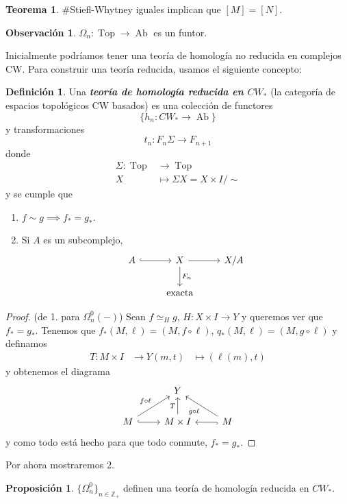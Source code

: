 \documentclass[spanish]{book}
\theoremstyle{definition}
\newtheorem*{defn}{Definición}
\newtheorem*{obs}{Observación}
\newtheorem*{teo}{Teorema}
\newtheorem*{prop}{Proposición}
\newcommand{\Z}{\mathbb{Z}}
\begin{document}
	\begin{teo}
		\#Stiefl-Whytney iguales implican que $[M]=[N]$.
	\end{teo}
	\begin{obs}
		$\Omega_n:\operatorname{Top}\to\operatorname{Ab}$ es un funtor.
	\end{obs}
	Inicialmente podríamos tener una teoría de homología no reducida en complejos CW. Para construir una teoría reducida, usamos el siguiente concepto:
	\begin{defn}
		Una \textbf{\textit{teoría de homología reducida en $CW_*$}} (la categoría de espacios topológicos CW basados) es una colección de functores
		\[\{h_n:CW_*\to\operatorname{Ab}\}\]
		y transformaciones
		\[t_n:F_n\Sigma\to F_{n+1}\]
		donde
		\begin{align*}
			\Sigma:\operatorname{Top}&\to\operatorname{Top}\\
			X&\mapsto \Sigma X=X\times I/\sim
		\end{align*}
		y se cumple que
		\begin{enumerate}
			\item $f\sim g\implies f_*=g_*$.
			\item Si $A$ es un subcomplejo,
			\[ \begin{tikzcd}
				A\arrow[r,hook]&X\arrow[d,"F_n"]\arrow[r]&X/A\\
				&\text{exacta}
			\end{tikzcd}\]
		\end{enumerate}
	\end{defn}
	\begin{proof}
		(de 1. para $\Omega_n^0(-)$) Sean $f\simeq_Hg$, $H:X\times I\to Y$ y queremos ver que $f_*=g_*$. Tenemos que $f_*(M,\ell)=(M,f\circ\ell)$, $q_*(M,\ell)=(M,g\circ\ell)$ y definamos
		\begin{align*}
			T:M\times I&\to Y
			(m,t)&\mapsto (\ell(m),t)
		\end{align*}
		y obtenemos el diagrama
		\[\begin{tikzcd}
			&Y\\
			M\arrow[ur,"f\circ\ell"]\arrow[r,hook]&M\times I\arrow[u,"T"]&M\arrow[l,hook]\arrow[ul,"g\circ\ell"]
		\end{tikzcd}\]
		y como todo está hecho para que todo conmute, $f_*=g_*$.
	\end{proof}
	Por ahora mostraremos 2.
	
	\begin{prop}
		$\{\Omega_n^0\}_{n\in\Z_+}$ definen una teoría de homología reducida en $CW_*$.
	\end{prop}
	
\end{document}

